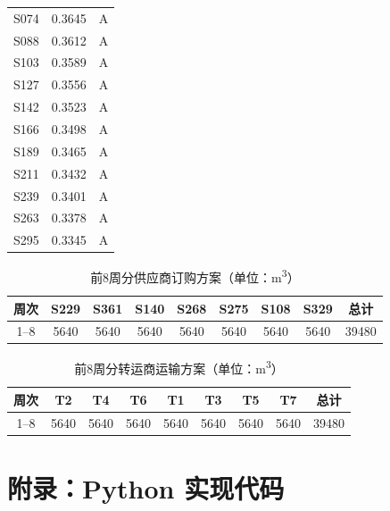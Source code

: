\documentclass[12pt]{article}
\begin{document}
\begin{table}[htbp]
\begin{tabular}{ccc}
S074 & 0.3645 & A \\
S088 & 0.3612 & A \\
S103 & 0.3589 & A \\
S127 & 0.3556 & A \\
S142 & 0.3523 & A \\
S166 & 0.3498 & A \\
S189 & 0.3465 & A \\
S211 & 0.3432 & A \\
S239 & 0.3401 & A \\
S263 & 0.3378 & A \\
S295 & 0.3345 & A \\
\end{tabular}
\end{table}

\begin{table}[htbp]
\centering
\caption{前8周分供应商订购方案（单位：\si{\cubic\meter}）}
\label{tab:order}
\begin{tabular}{c|ccccccc|c}
\toprule
周次 & S229 & S361 & S140 & S268 & S275 & S108 & S329 & 总计 \\
\midrule
1–8 & 5640 & 5640 & 5640 & 5640 & 5640 & 5640 & 5640 & 39480 \\
\bottomrule
\end{tabular}
\end{table}

\begin{table}[htbp]
\centering
\caption{前8周分转运商运输方案（单位：\si{\cubic\meter}）}
\label{tab:transport}
\begin{tabular}{c|ccccccc|c}
\toprule
周次 & T2 & T4 & T6 & T1 & T3 & T5 & T7 & 总计 \\
\midrule
1–8 & 5640 & 5640 & 5640 & 5640 & 5640 & 5640 & 5640 & 39480 \\
\bottomrule
\end{tabular}
\end{table}

\section*{附录：Python 实现代码}
\end{document}
